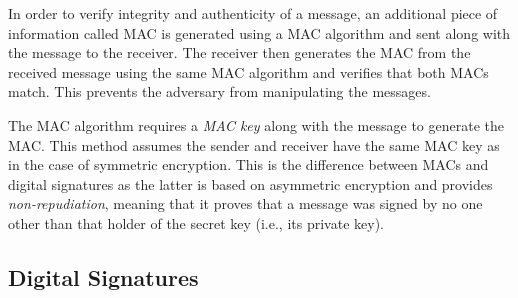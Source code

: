 \documentclass[11pt]{article}
\theoremstyle{plain}
\begin{document}
In order to verify integrity and authenticity of a message, an additional
piece of information called MAC is generated using a MAC algorithm
and sent along with the message to the receiver. The receiver then
generates the MAC from the received message using the same MAC algorithm
and verifies that both MACs match. This prevents the adversary from
manipulating the messages. 

The MAC algorithm requires a \emph{MAC key} along with the message
to generate the MAC. This method assumes the sender and receiver have
the same MAC key as in the case of symmetric encryption. This is the
difference between MACs and digital signatures as the latter is based
on asymmetric encryption and provides \emph{non-repudiation}, meaning
that it proves that a message was signed by no one other than that
holder of the secret key (i.e., its private key).

\subsection{Digital Signatures}
\end{document}
